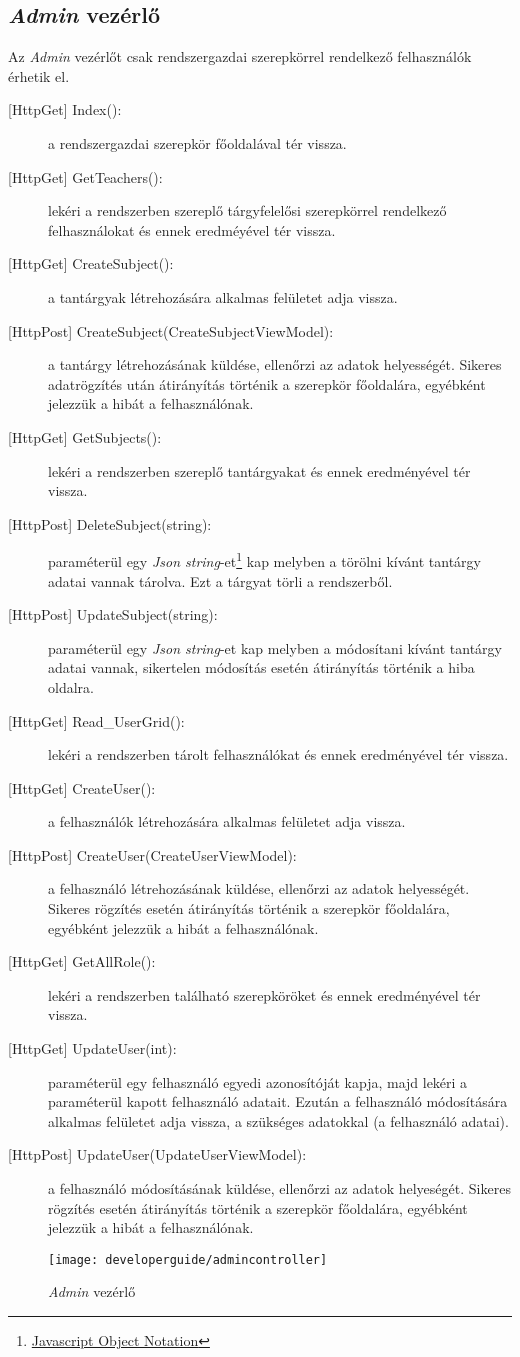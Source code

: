 \subsection{\emph{Admin} vezérlő}
Az \emph{Admin} vezérlőt csak rendszergazdai szerepkörrel rendelkező felhasználók érhetik el.
\begin{description}
	\item[{[HttpGet]} Index():] a rendszergazdai szerepkör főoldalával tér vissza.
	\item[{[HttpGet]} GetTeachers():] lekéri a rendszerben szereplő tárgyfelelősi szerepkörrel rendelkező felhasználokat és ennek eredméyével tér vissza.
	\item[{[HttpGet]} CreateSubject():] a tantárgyak létrehozására alkalmas felületet adja vissza.
	\item[{[HttpPost]} CreateSubject(CreateSubjectViewModel):] a tantárgy létrehozásának küldése, ellenőrzi az adatok helyességét. Sikeres adatrögzítés után átirányítás történik a szerepkör főoldalára, egyébként jelezzük a hibát a felhasználónak.
	\item[{[HttpGet]} GetSubjects():] lekéri a rendszerben szereplő tantárgyakat és ennek eredményével tér vissza.
	\item[{[HttpPost]} DeleteSubject(string):] paraméterül egy \emph{Json string}-et\footnote{\href{https://www.json.org/json-en.html}{Javascript Object Notation}} kap melyben a törölni kívánt tantárgy adatai vannak tárolva. Ezt a tárgyat törli a rendszerből.
	\item[{[HttpPost]} UpdateSubject(string):] paraméterül egy \emph{Json string}-et kap melyben a módosítani kívánt tantárgy adatai vannak, sikertelen módosítás esetén átirányítás történik a hiba oldalra.
	\item[{[HttpGet]} Read\_UserGrid():] lekéri a rendszerben tárolt felhasználókat és ennek eredményével tér vissza.
	\item[{[HttpGet]} CreateUser():] a felhasználók létrehozására alkalmas felületet adja vissza.
	\item[{[HttpPost]} CreateUser(CreateUserViewModel):] a felhasználó létrehozásának küldése, ellenőrzi az adatok helyességét. Sikeres rögzítés esetén átirányítás történik a szerepkör főoldalára, egyébként jelezzük a hibát a felhasználónak.
	\item[{[HttpGet]} GetAllRole():] lekéri a rendszerben található szerepköröket és ennek eredményével tér vissza.
	\item[{[HttpGet]} UpdateUser(int):] paraméterül egy felhasználó egyedi azonosítóját kapja, majd lekéri a paraméterül kapott felhasználó adatait. Ezután a felhasználó módosítására alkalmas felületet adja vissza, a szükséges adatokkal (a felhasználó adatai).
	\item[{[HttpPost]} UpdateUser(UpdateUserViewModel):] a felhasználó módosításának küldése, ellenőrzi az adatok helyeségét. Sikeres rögzítés esetén átirányítás történik a szerepkör főoldalára, egyébként jelezzük a hibát a felhasználónak.
\end{description}
\begin{figure}[H]
	\centering
	\texttt{[image: developerguide/admincontroller]}
	\caption{\emph{Admin} vezérlő}
	\label{fig:admincontroller}
\end{figure}
